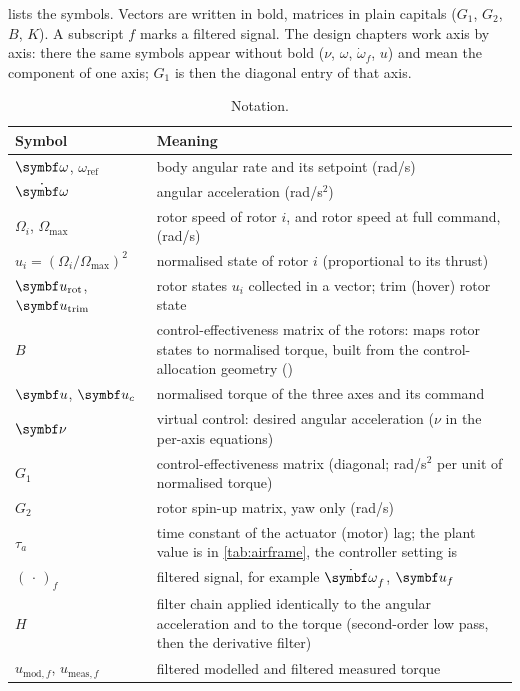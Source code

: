  lists the symbols.
Vectors are written in bold, matrices in plain capitals ($G_1$, $G_2$, $B$, $K$).
A subscript $f$ marks a filtered signal.
The design chapters work axis by axis: there the same symbols appear without bold ($\nu$, $\omega$, $\dot\omega_f$, $u$) and mean the component of one axis; $G_1$ is then the diagonal entry of that axis.

\begin{table}[tbp]
\caption{Notation.}\label{tab:notation}
\centering
\small
\begin{tabularx}{\textwidth}{@{}l Y@{}}
\toprule
Symbol & Meaning \\
\midrule
$\vect\omega$, $\omega_{\mathrm{ref}}$ & body angular rate and its setpoint (rad/s) \\
$\dot{\vect\omega}$ & angular acceleration (rad/s$^2$) \\
$\Omega_i$, $\Omega_{\max}$ & rotor speed of rotor $i$, and rotor speed at full command,  (rad/s) \\
$u_i = (\Omega_i/\Omega_{\max})^2$ & normalised state of rotor $i$ (proportional to its thrust) \\
$\vect u_{\mathrm{rot}}$, $\vect u_{\mathrm{trim}}$ & rotor states $u_i$ collected in a vector; trim (hover) rotor state \\
$B$ & control-effectiveness matrix of the rotors: maps rotor states to normalised torque, built from the control-allocation geometry () \\
$\vect u$, $\vect u_c$ & normalised torque of the three axes and its command \\
$\vect\nu$ & virtual control: desired angular acceleration ($\nu$ in the per-axis equations) \\
$G_1$ & control-effectiveness matrix (diagonal; rad/s$^2$ per unit of normalised torque) \\
$G_2$ & rotor spin-up matrix, yaw only (rad/s) \\
$\tau_a$ & time constant of the actuator (motor) lag; the plant value is in \cref{tab:airframe}, the controller setting is  \\
$(\,\cdot\,)_f$ & filtered signal, for example $\dot{\vect\omega}_f$, $\vect u_f$ \\
$H$ & filter chain applied identically to the angular acceleration and to the torque (second-order low pass, then the derivative filter) \\
$u_{\mathrm{mod},f}$, $u_{\mathrm{meas},f}$ & filtered modelled and filtered measured torque \\

\end{tabularx}
\end{table}
